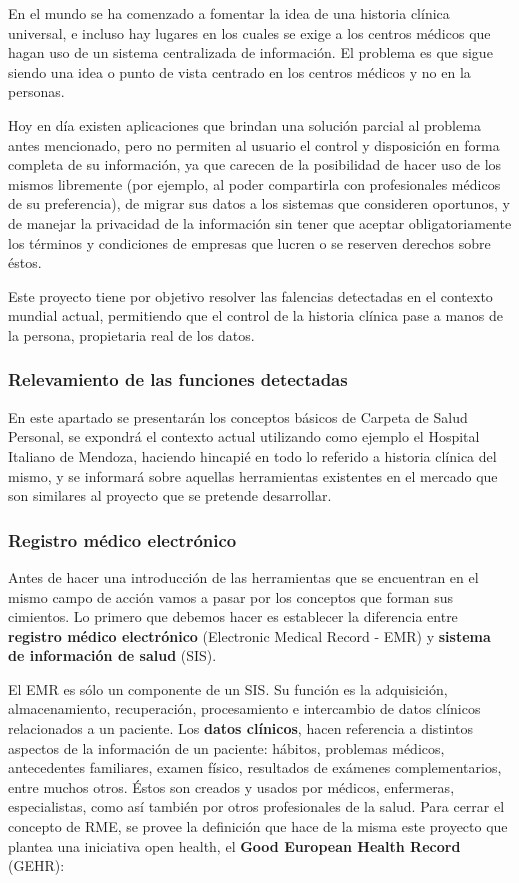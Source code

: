 En el mundo se ha comenzado a fomentar la idea de una historia clínica universal, e incluso hay lugares en los cuales se exige a los centros médicos que hagan uso de un sistema centralizada de  información.
El problema es que sigue siendo una idea o punto de vista centrado en los centros médicos y no en la personas.

Hoy en día existen aplicaciones que brindan una solución parcial al problema antes mencionado, pero no permiten al usuario el control y disposición en forma completa de su información, ya que carecen de la posibilidad de hacer uso de los mismos libremente (por ejemplo, al poder compartirla con profesionales médicos de su preferencia), de migrar sus datos a los sistemas que consideren oportunos, y de manejar la privacidad de la información sin tener que aceptar obligatoriamente los términos y condiciones de empresas que lucren o se reserven derechos sobre éstos.

Este proyecto tiene por objetivo resolver las falencias detectadas en el contexto mundial actual, permitiendo que el control de la historia clínica pase a manos de la persona, propietaria real de los datos.


\subsubsection{Relevamiento de las funciones detectadas}
En este apartado se presentarán los conceptos básicos de Carpeta de Salud Personal, se expondrá el contexto actual utilizando como ejemplo el Hospital Italiano de Mendoza, haciendo hincapié en todo lo referido a historia clínica del mismo, y se informará sobre aquellas herramientas existentes en el mercado que son similares al proyecto que se pretende desarrollar.

\subsubsection{Registro médico electrónico}
	Antes de hacer una introducción de las herramientas que se encuentran en el mismo campo de acción vamos a pasar por los conceptos que forman sus cimientos.
Lo primero que debemos hacer es establecer la diferencia entre \textbf{registro médico electrónico} (Electronic Medical Record - EMR) y \textbf{sistema de información de salud} (SIS).

El EMR es sólo un componente de un SIS.
Su función es la adquisición, almacenamiento, recuperación, procesamiento e intercambio de datos clínicos relacionados a un paciente.
Los \textbf{datos clínicos}, hacen referencia a distintos aspectos de la información de un paciente: hábitos, problemas médicos, antecedentes familiares, examen físico, resultados de exámenes complementarios, entre muchos otros.
Éstos son creados y usados por médicos, enfermeras, especialistas, como así también por otros profesionales de la salud.
Para cerrar el concepto de RME, se provee la definición que hace de la misma este proyecto que plantea una iniciativa open health, el \textbf{Good European Health Record} (GEHR):

